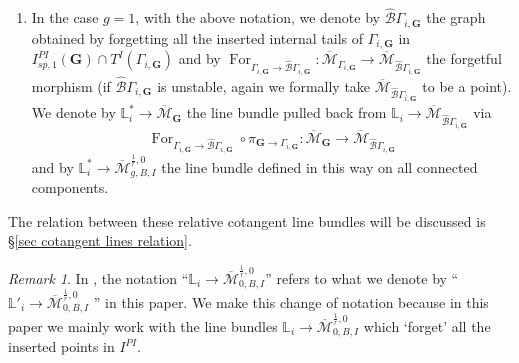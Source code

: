 \documentclass[11pt]{amsart}
\theoremstyle{definition}
\theoremstyle{remark}
\newtheorem{rmk}[dummy]{Remark}
\newcommand{\<}{\left<}
\renewcommand{\>}{\right>}
\numberwithin{equation}{section}
\def\Mbar{{\overline{\mathcal M}}}
\begin{document}
\begin{enumerate}
    \item 
    In the case $g=1$, with the above notation, we denote by $\hat{\mathcal B} \Gamma_{i,\bm{G}}$ the graph obtained by forgetting all the inserted internal tails of $\Gamma_{i,\bm{G}}$ in $I^{PI}_{sp,1}(\bm{G})\cap T^I(\Gamma_{i,\bm{G}})$ and by $\operatorname{For}_{\Gamma_{i,\bm{G}}\to \hat{\mathcal B} \Gamma_{i,\bm{G}}}\colon \Mbar_{\Gamma_{i,\bm{G}}}\to \Mbar_{\hat{\mathcal B} \Gamma_{i,\bm{G}}}$ the forgetful morphism (if $\hat{\mathcal B} \Gamma_{i,\bm{G}}$ is %
unstable, again we formally %
take $\Mbar_{\hat{\mathcal B} \Gamma_{i,\bm{G}}}$ to be a point). We denote by $\mathbb L^*_i\to \Mbar_{\bm{G}}$ the line bundle pulled back from $\mathbb L_i\to \Mbar_{\hat{\mathcal B} \Gamma_{i,\bm{G}}}$ via 
    $$\operatorname{For}_{\Gamma_{i,\bm{G}}\to \hat{\mathcal B} \Gamma_{i,\bm{G}}}\circ \pi_{\bm{G}\to \Gamma_{i,\bm{G}}} \colon \Mbar_{\bm{G}} \to \Mbar_{\hat{\mathcal B} \Gamma_{i,\bm{G}}}$$ 
    and by $\mathbb L^*_i\to \Mbar^{\frac{1}{r},0}_{g,B,I}$ the line bundle defined in this way on all connected components.
    
    \end{enumerate}

 The relation between these relative cotangent line bundles will be discussed is \S \ref{sec cotangent lines relation}.

\begin{rmk}\label{rmk different notation for L in TZ}
    In \cite{TZ1,TZ2}, the notation ``$\mathbb L_i\to \Mbar^{\frac{1}{r},0}_{0,B,I}$'' refers to what we denote by ``$\mathbb L'_i\to \Mbar^{\frac{1}{r},0}_{0,B,I}$ %
'' in this paper. We %
make this change of notation because in this paper we mainly work with the line bundles $\mathbb L_i\to \Mbar^{\frac{1}{r},0}_{0,B,I}$ %
which `forget' all %
the inserted points in $I^{PI}$. 
\end{rmk}
\end{document}
